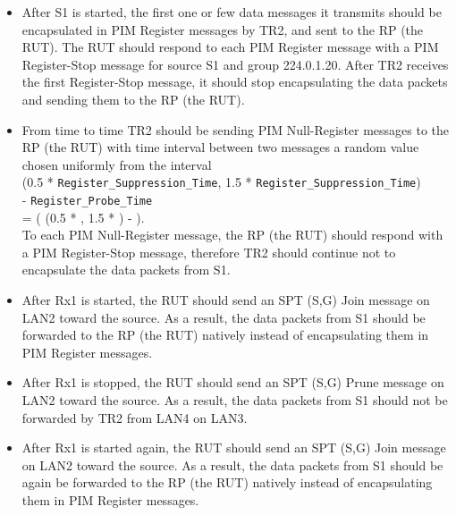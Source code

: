 \documentclass[11pt]{report}
\begin{document}
\begin{itemize}

  \item After S1 is started, the first one or few data messages it transmits
  should be encapsulated in PIM Register messages by TR2, and sent to the RP
  (the RUT). The RUT should respond to each PIM Register message with a PIM
  Register-Stop message for source S1 and group 224.0.1.20. After TR2 receives
  the first Register-Stop message, it should stop encapsulating the data
  packets and sending them to the RP (the RUT).

  \item From time to time TR2 should be sending PIM Null-Register
  messages to the RP (the RUT) with time interval between two messages a random
  value chosen uniformly from the interval \\
  (0.5 * \verb=Register_Suppression_Time=,
  1.5 * \verb=Register_Suppression_Time=) \\
  - \verb=Register_Probe_Time= \\
  = ( (0.5 * {\PimsmRegisterSuppressionTime}, 1.5 *
  {\PimsmRegisterSuppressionTime}) - {\PimsmRegisterProbeTime} ). \\
  To each PIM Null-Register message, the RP (the RUT) should respond with a
  PIM Register-Stop message, therefore TR2 should continue not to
  encapsulate the data packets from S1.

  \item After Rx1 is started, the RUT should send an SPT (S,G) Join message
  on LAN2 toward the source. As a result, the data packets from S1 should be
  forwarded to the RP (the RUT) natively instead of encapsulating them in PIM
  Register messages.

  \item After Rx1 is stopped, the RUT should send an SPT (S,G) Prune message
  on LAN2 toward the source. As a result, the data packets from S1 should not
  be forwarded by TR2 from LAN4 on LAN3.

  \item After Rx1 is started again, the RUT should send an SPT (S,G) Join
  message on LAN2 toward the source. As a result, the data packets from S1
  should be again be forwarded to the RP (the RUT) natively instead of
  encapsulating them in PIM Register messages.

\end{itemize}

\end{document}
